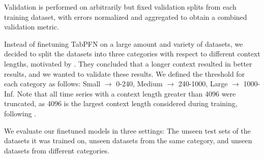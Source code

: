 Validation is performed on arbitrarily but fixed validation splits from each training dataset, with errors normalized and aggregated to obtain a combined validation metric.

Instead of finetuning TabPFN on a large amount and variety of datasets, we decided to split the datasets into three categories with respect to different context lengths, motivated by \citet{Hollmann_2025}.
They concluded that a longer context resulted in better results, and we wanted to validate these results.
\newline
We defined the threshold for each category as follows: Small $\rightarrow$ 0-240, Medium $\rightarrow$ 240-1000, Large $\rightarrow$ 1000-Inf.
Note that all time series with a context length greater than 4096 were truncated, as 4096 is the largest context length considered during training, following \citet{hoo2025tables}.

We evaluate our finetuned models in three settings:
The unseen test sets of the datasets it was trained on, unseen datasets from the same category, and unseen datasets from different categories.
\newpage
